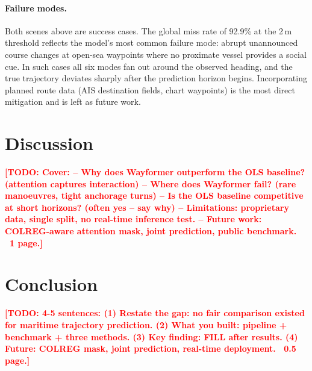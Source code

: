 \documentclass[12pt, a4paper]{article}
\newcommand{\TODO}[1]{\textcolor{red}{\textbf{[TODO: #1]}}}
\begin{document}
  \paragraph{Failure modes.}
  Both scenes above are success cases.  The global miss rate of 92.9\%
  at the 2\,m threshold reflects the model's most common failure mode:
  abrupt unannounced course changes at open-sea waypoints where no proximate
  vessel provides a social cue.  In such cases all six modes fan out around
  the observed heading, and the true trajectory deviates sharply after the
  prediction horizon begins.  Incorporating planned route data (AIS
  destination fields, chart waypoints) is the most direct mitigation and
  is left as future work.

  \section{Discussion}
  \label{sec:discussion}

  \TODO{Cover:
  -- Why does Wayformer outperform the OLS baseline? (attention captures interaction)
  -- Where does Wayformer fail? (rare manoeuvres, tight anchorage turns)
  -- Is the OLS baseline competitive at short horizons? (often yes -- say why)
  -- Limitations: proprietary data, single split, no real-time inference test.
  -- Future work: COLREG-aware attention mask, joint prediction, public benchmark.
  ~1 page.}

  \section{Conclusion}
  \label{sec:conclusion}

  \TODO{4-5 sentences:
  (1) Restate the gap: no fair comparison existed for maritime trajectory prediction.
  (2) What you built: pipeline + benchmark + three methods.
  (3) Key finding: FILL after results.
  (4) Future: COLREG mask, joint prediction, real-time deployment.
  ~0.5 page.}

  
  

  
\end{document}
